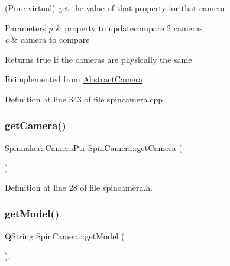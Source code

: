 (Pure virtual) get the value of that property for that camera 


\begin{DoxyParams}{Parameters}
{\em p} & property to updatecompare 2 cameras \\
\hline
{\em c} & camera to compare \\
\hline
\end{DoxyParams}
\begin{DoxyReturn}{Returns}
true if the cameras are physically the same 
\end{DoxyReturn}


Reimplemented from \mbox{\hyperlink{class_abstract_camera_a244917ab081c18caf389473847871dd6}{Abstract\+Camera}}.



Definition at line 343 of file spincamera.\+cpp.

\mbox{\label{class_spin_camera_aa7d20cfe4e16b461580e98c0cd8982f7}} 
\subsubsection{\texorpdfstring{getCamera()}{getCamera()}}
{\footnotesize\ttfamily Spinnaker\+::\+Camera\+Ptr Spin\+Camera\+::get\+Camera (\begin{DoxyParamCaption}{ }\end{DoxyParamCaption})\hspace{0.3cm}{\ttfamily [inline]}}



Definition at line 28 of file spincamera.\+h.

\mbox{\label{class_spin_camera_a254522436d6e70878a8b2df0654614c8}} 
\subsubsection{\texorpdfstring{getModel()}{getModel()}}
{\footnotesize\ttfamily Q\+String Spin\+Camera\+::get\+Model (\begin{DoxyParamCaption}{ }\end{DoxyParamCaption})\hspace{0.3cm}{\ttfamily [inline]}, {\ttfamily [virtual]}}



